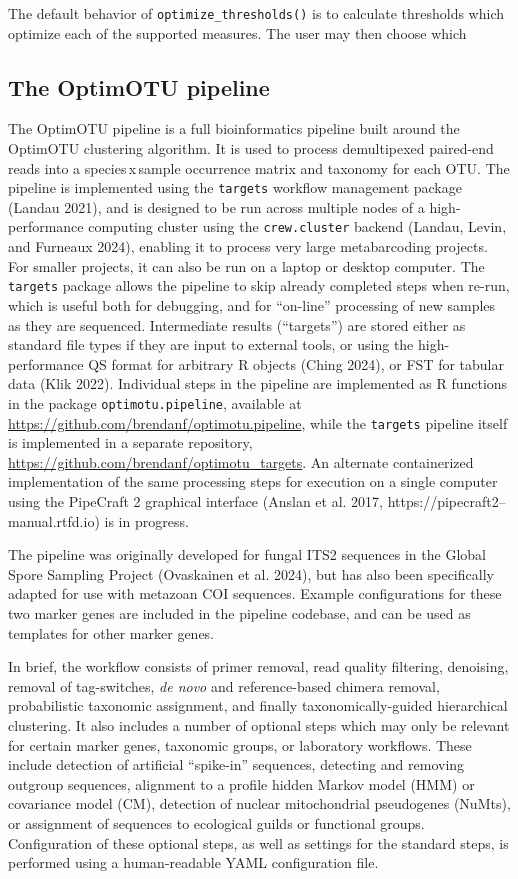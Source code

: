 \documentclass[
]{article}
\begin{document}
The default behavior of \texttt{optimize\_thresholds()} is to calculate thresholds which optimize each of the supported measures.
The user may then choose which

\subsection{The OptimOTU pipeline}\label{the-optimotu-pipeline}

The OptimOTU pipeline is a full bioinformatics pipeline built around the OptimOTU clustering algorithm.
It is used to process demultipexed paired-end reads into a species\,x\,sample occurrence matrix and taxonomy for each OTU.
The pipeline is implemented using the \texttt{targets} workflow management package (Landau 2021), and is designed to be run across multiple nodes of a high-performance computing cluster using the \texttt{crew.cluster} backend (Landau, Levin, and Furneaux 2024), enabling it to process very large metabarcoding projects.
For smaller projects, it can also be run on a laptop or desktop computer.
The \texttt{targets} package allows the pipeline to skip already completed steps when re-run, which is useful both for debugging, and for ``on-line'' processing of new samples as they are sequenced.
Intermediate results (``targets'') are stored either as standard file types if they are input to external tools, or using the high-performance QS format for arbitrary R objects (Ching 2024), or FST for tabular data (Klik 2022).
Individual steps in the pipeline are implemented as R functions in the package \texttt{optimotu.pipeline}, available at \url{https://github.com/brendanf/optimotu.pipeline}, while the \texttt{targets} pipeline itself is implemented in a separate repository, \url{https://github.com/brendanf/optimotu_targets}.
An alternate containerized implementation of the same processing steps for execution on a single computer using the PipeCraft 2 graphical interface (Anslan et al. 2017, https://pipecraft2--manual.rtfd.io) is in progress.

The pipeline was originally developed for fungal ITS2 sequences in the Global Spore Sampling Project (Ovaskainen et al. 2024), but has also been specifically adapted for use with metazoan COI sequences.
Example configurations for these two marker genes are included in the pipeline codebase, and can be used as templates for other marker genes.

In brief, the workflow consists of primer removal, read quality filtering, denoising, removal of tag-switches, \emph{de novo} and reference-based chimera removal, probabilistic taxonomic assignment, and finally taxonomically-guided hierarchical clustering.
It also includes a number of optional steps which may only be relevant for certain marker genes, taxonomic groups, or laboratory workflows.
These include detection of artificial ``spike-in'' sequences, detecting and removing outgroup sequences, alignment to a profile hidden Markov model (HMM) or covariance model (CM), detection of nuclear mitochondrial pseudogenes (NuMts), or assignment of sequences to ecological guilds or functional groups.
Configuration of these optional steps, as well as settings for the standard steps, is performed using a human-readable YAML configuration file.
\end{document}
